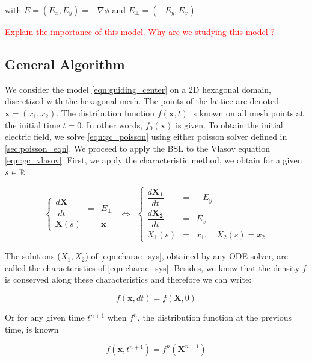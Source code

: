 \documentclass[proc]{edpsmath}
\begin{document}
with $E = (E_x, E_y) = - \nabla \phi $ and $E_\perp = (-E_y, E_x)$.


\textcolor{red}{Explain the importance of this model. Why are we studying this model ?}

\subsection{General Algorithm}
We consider the model \eqref{eqn:guiding_center} on a 2D hexagonal domain, discretized with the hexagonal mesh. The points of the lattice are denoted $\mathbf{x}=(x_1, x_2)$. The distribution function $f(\mathbf{x},t)$ is known on all mesh points at the initial time $t=0$. In other words, $f_0(\mathbf{x})$ is given. To obtain the initial electric field, we solve \eqref{eqn:gc_poisson} using either poisson solver defined in \ref{sec:poisson_eqn}. We proceed to apply the BSL to the Vlasov equation \eqref{eqn:gc_vlasov}: First, we apply the characteristic method, we obtain for a given $s \in \mathbb{R} $

\begin{equation}
	\label{eqn:charac_sys}
	\left\lbrace
	\begin{array}{lcl}
	\displaystyle \dfrac{d \mathbf{X}}{dt} &=& E_\perp\\[0.3cm]
	\displaystyle \mathbf{X}(s) &=& \mathbf{x}
	\end{array}\right.
~~\Longleftrightarrow ~~
	\left\lbrace
	\begin{array}{lcl}
	\displaystyle \dfrac{d \mathbf{X_1}}{dt} &=& -E_y\\[0.3cm]
	\displaystyle \dfrac{d \mathbf{X_2}}{dt} &=& E_x\\[0.3cm]
	\displaystyle X_1(s) &=& x_1, \quad   X_2(s) = x_2
	\end{array}\right.
\end{equation}

The solutions ($X_1, X_2$) of \eqref{eqn:charac_sys}, obtained by any ODE solver, are called the characteristics of \eqref{eqn:charac_sys}. Besides, we know that the density $f$ is conserved along these characteristics and therefore we can write:

\begin{equation}
	f(\mathbf{x}, dt) = f(\mathbf{X}, 0)
\end{equation}

Or for any given time $t^{n+1}$ when $f^n$, the distribution function at the previous time, is known

\begin{equation}
\label{eqn:SL_eqn}
	f(\mathbf{x}, t^{n+1}) = f^n(\mathbf{X}^{n+1})
\end{equation}
\end{document}
